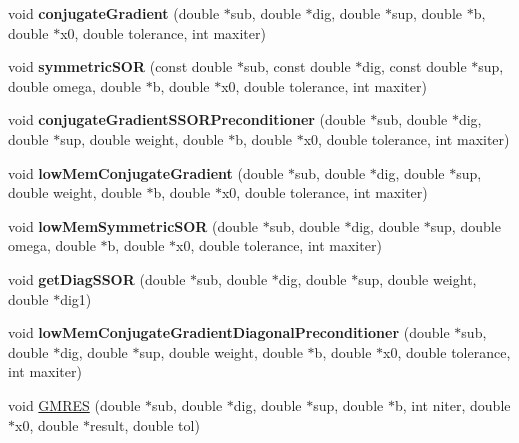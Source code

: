 \begin{DoxyCompactItemize}
void {\bfseries conjugate\+Gradient} (double $\ast$sub, double $\ast$dig, double $\ast$sup, double $\ast$b, double $\ast$x0, double tolerance, int maxiter)
\item 
\mbox{\label{classTridiag_a159db18dc020438d27830745dfa582ea}} 
void {\bfseries symmetric\+S\+OR} (const double $\ast$sub, const double $\ast$dig, const double $\ast$sup, double omega, double $\ast$b, double $\ast$x0, double tolerance, int maxiter)
\item 
\mbox{\label{classTridiag_aaf82a8b0f0157f8bacc794fbed6e46aa}} 
void {\bfseries conjugate\+Gradient\+S\+S\+O\+R\+Preconditioner} (double $\ast$sub, double $\ast$dig, double $\ast$sup, double weight, double $\ast$b, double $\ast$x0, double tolerance, int maxiter)
\item 
\mbox{\label{classTridiag_a96ab51802c31bca01e1aa330d8ea8d9b}} 
void {\bfseries low\+Mem\+Conjugate\+Gradient} (double $\ast$sub, double $\ast$dig, double $\ast$sup, double weight, double $\ast$b, double $\ast$x0, double tolerance, int maxiter)
\item 
\mbox{\label{classTridiag_a0de438c191f328e467d11645360d2ffa}} 
void {\bfseries low\+Mem\+Symmetric\+S\+OR} (double $\ast$sub, double $\ast$dig, double $\ast$sup, double omega, double $\ast$b, double $\ast$x0, double tolerance, int maxiter)
\item 
\mbox{\label{classTridiag_a53fef4c6896e1f385d2e45bbe274e01c}} 
void {\bfseries get\+Diag\+S\+S\+OR} (double $\ast$sub, double $\ast$dig, double $\ast$sup, double weight, double $\ast$dig1)
\item 
\mbox{\label{classTridiag_a848a432925ca2e4197aa39bfcf918add}} 
void {\bfseries low\+Mem\+Conjugate\+Gradient\+Diagonal\+Preconditioner} (double $\ast$sub, double $\ast$dig, double $\ast$sup, double weight, double $\ast$b, double $\ast$x0, double tolerance, int maxiter)
\item 
void \mbox{\hyperlink{classTridiag_a90777148984f7504ab69469c84129204}{G\+M\+R\+ES}} (double $\ast$sub, double $\ast$dig, double $\ast$sup, double $\ast$b, int niter, double $\ast$x0, double $\ast$result, double tol)
\item 
\mbox{\label{classTridiag_a94ff45f203fa7862e202df5daf8c7eb1}} 

\end{DoxyCompactItemize}
